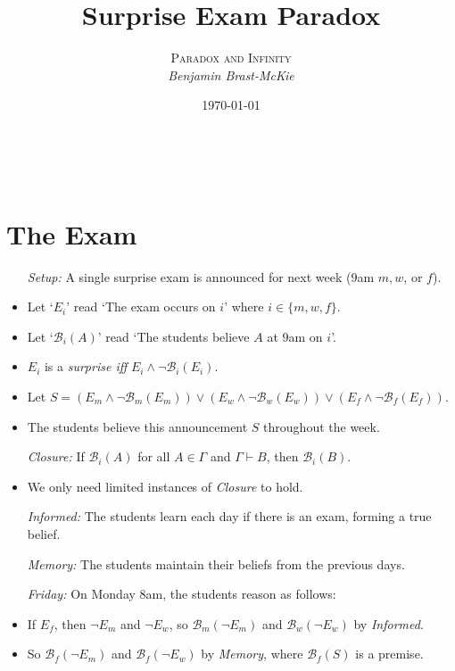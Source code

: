 \documentclass[a4paper, 11pt]{article} %
\title{\textbf{Surprise Exam Paradox}} %
\author{\textsc{Paradox and Infinity}\\ \em Benjamin Brast-McKie} %
\date{\today} %
\makeatletter
\newcommand{\set}[1]{\lbrace#1\rbrace} %
\newcommand{\B}{\mathcal{B}}
\newcommand{\B}{\mathfrak{B}}
\renewcommand{\maketitle}{ %
\begin{flushright} %
{\LARGE\@title} %

\vspace{10pt} %

{\@author} %
\\\@date %

\vspace{-30pt} %
\end{flushright}
}
\makeatother
\begin{document}
\maketitle %

\thispagestyle{empty}


\section*{The Exam}

\begin{itemize}
  \item[\it Setup:] A single surprise exam is announced for next week ($9$am $m, w$, or $f$).
    \item Let `$E_i$' read `The exam occurs on $i$' where $i \in \set{m, w, f}$.
    \item Let `$\B_i(A)$' read `The students believe $A$ at $9$am on $i$'.
    \item $E_i$ is a \textit{surprise iff} $E_i \wedge \neg \B_i(E_i)$.
    \item Let $S = (E_m \wedge \neg \B_m(E_m)) \vee (E_w \wedge \neg \B_w(E_w)) \vee (E_f \wedge \neg \B_f(E_f))$.
    \item The students believe this announcement $S$ throughout the week.
  \item[\it Closure:] If $\B_i(A)$ for all $A \in \Gamma$ and $\Gamma \vdash B$, then $\B_i(B)$.
    \item We only need limited instances of \textit{Closure} to hold.
  \item[\it Informed:] The students learn each day if there is an exam, forming a true belief.
  \item[\it Memory:] The students maintain their beliefs from the previous days.
  \item[\it Friday:] On Monday $8$am, the students reason as follows:
    \item If $E_f$, then $\neg E_m$ and $\neg E_w$, so $\B_m(\neg E_m)$ and $\B_w(\neg E_w)$ by \textit{Informed}.
    \item So $\B_f(\neg E_m)$ and $\B_f(\neg E_w)$ by \textit{Memory}, where $\B_f(S)$ is a premise. 

\end{itemize}
\end{document}
